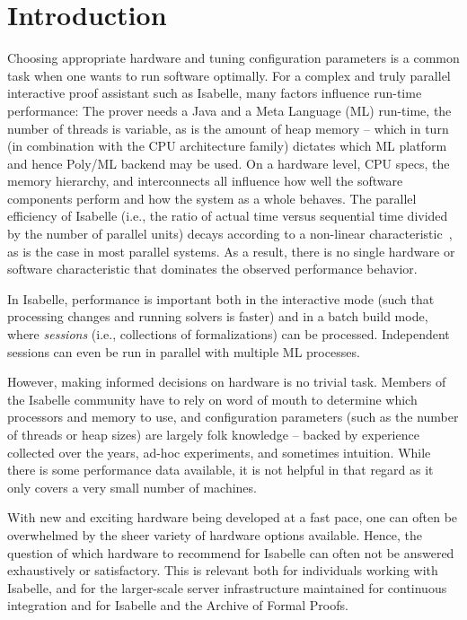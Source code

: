 
\section{Introduction}
Choosing appropriate hardware and tuning configuration parameters
is a common task when one wants to run software optimally.
For a complex and truly parallel interactive proof assistant such as Isabelle,
many factors influence run-time performance:
The prover needs a Java and a Meta Language (ML) run-time,
the number of threads is variable,
as is the amount of heap memory --
which in turn 
(in combination with the CPU architecture family)
dictates which ML platform and hence Poly/ML backend may be used.
On a hardware level, CPU specs, the memory hierarchy, and interconnects
all influence how well the software components perform and how the system as a whole behaves.
The parallel efficiency of Isabelle
(i.e., the ratio of actual time versus sequential time divided by the number of parallel units)
decays according to a non-linear characteristic~\cite{Parallel2009Wenzel}, as is the case in most parallel systems.
As a result, there is no single hardware or software characteristic that dominates the observed performance behavior.

In Isabelle,
performance is important both in the interactive mode (such that processing changes and running solvers is faster)
and in a batch build mode, where \emph{sessions} 
(i.e., collections of formalizations) can be processed.
Independent sessions can even be run in parallel with multiple ML processes.

However, making informed decisions on hardware is no trivial task.
Members of the Isabelle community have to rely on word of mouth to determine which processors and memory to use,
and configuration parameters
(such as the number of threads or heap sizes)
are largely folk knowledge
-- backed by experience collected over the years, ad-hoc experiments, and sometimes intuition.
While there is some performance data available,
it is not helpful in that regard as it only covers a very small number of machines.

With new and exciting hardware being developed at a fast pace,
one can often be overwhelmed by the sheer variety of hardware options available.
Hence, the question of which hardware to recommend for Isabelle can often not be answered exhaustively or satisfactory.
This is relevant both for individuals working with Isabelle,
and for the larger-scale server infrastructure maintained for continuous integration and for Isabelle and the Archive of Formal Proofs.

